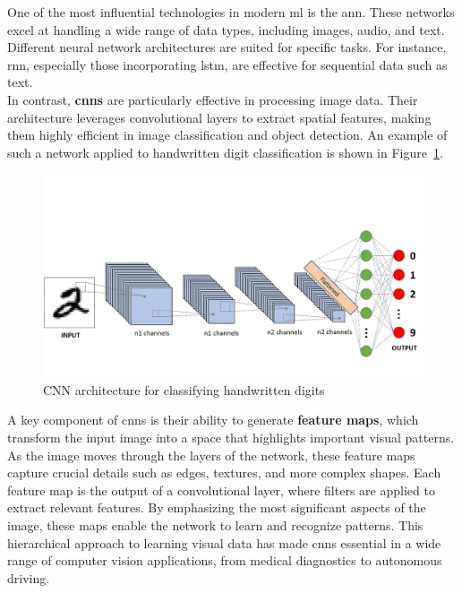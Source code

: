 One of the most influential technologies in modern \gls{ml} is the \gls{ann}. These networks excel at handling a wide range of data types, including images, audio, and text. Different neural network architectures are suited for specific tasks. For instance, \gls{rnn}, especially those incorporating \gls{lstm}, are effective for sequential data such as text. \\

In contrast, \textbf{\glspl{cnn}} are particularly effective in processing image data. Their architecture leverages convolutional layers to extract spatial features, making them highly efficient in image classification and object detection. An example of such a network applied to handwritten digit classification is shown in Figure~\ref{fig:convolutional-neural-network}. \\

\newpage

\begin{figure}[h!] \centering \includegraphics[width=0.75\linewidth]{figures/theory/machine-learning/convolutional-neural-network.png} \caption[CNN architecture for handwritten digit classification]{CNN architecture for classifying handwritten digits \cite{medium:cnn}} \label{fig:convolutional-neural-network} \end{figure}

A key component of \glspl{cnn} is their ability to generate \textbf{feature maps}, which transform the input image into a space that highlights important visual patterns. As the image moves through the layers of the network, these feature maps capture crucial details such as edges, textures, and more complex shapes. Each feature map is the output of a convolutional layer, where filters are applied to extract relevant features. By emphasizing the most significant aspects of the image, these maps enable the network to learn and recognize patterns. This hierarchical approach to learning visual data has made \glspl{cnn} essential in a wide range of computer vision applications, from medical diagnostics to autonomous driving. \\

